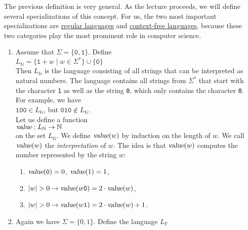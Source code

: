 The previous definition is very general.  As the lecture proceeds, we will define several
specializations of this concept.  For us, the two most important specializations are 
\href{http://en.wikipedia.org/wiki/Regular_language}{regular languages} and
\href{http://en.wikipedia.org/wiki/Context-free_language}{context-free languages}, 
because these two categories  play the most prominent role in computer science. 


\examplesEng
\begin{enumerate}
\item Assume that $\Sigma = \{\mathtt{0},\mathtt{1}\}$.  Define
      \\[0.2cm]
      \hspace*{1.3cm}
      $L_\mathbb{N} = \{ \mathtt{1}+w \mid w \in \Sigma^* \} \cup \{ \mathtt{0} \}$
      \\[0.2cm]
      Then $L_\mathbb{N}$ is the language consisting of all strings that can be interpreted as
      natural numbers.  The language contains all strings from $\Sigma^*$  that start with 
      the character \texttt{1} as well as the string \texttt{0}, which only contains the character
      \texttt{0}.  For example, we have
      \\[0.2cm]
      \hspace*{1.3cm}
      $\mathtt{100} \in L_\mathbb{N}$, \quad but \quad $\mathtt{010} \not\in L_\mathbb{N}$.
      \\[0.2cm]
      Let us define a function 
      \\[0.2cm]
      \hspace*{1.3cm}
      $\textsl{value}: L_\mathbb{N} \rightarrow \mathbb{N}$
      \\[0.2cm]
      on the set $L_\mathbb{N}$.  We define $\textsl{value}(w)$ by induction on the length of $w$.
      We call $\textsl{value}(w)$ the \emph{interpretation} of $w$.  The idea is that
      $\textsl{value}(w)$ computes the number represented by the string $w$:
      \begin{enumerate}
      \item $\textsl{value}(\mathtt{0}) = 0$, $\textsl{value}(1) = 1$,
      \item $|w| > 0 \rightarrow \textsl{value}(w\mathtt{0}) = 2 \cdot \textsl{value}(w)   $,
      \item $|w| > 0 \rightarrow \textsl{value}(w\mathtt{1}) = 2 \cdot \textsl{value}(w) + 1$.
      \end{enumerate}
\item Again we have $\Sigma = \{0,1\}$. Define the language $L_\mathbb{P}$

\end{enumerate}
